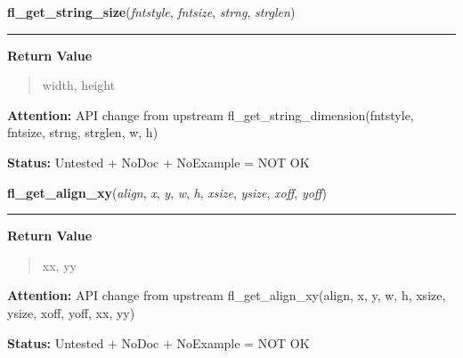     \label{xformslib:library:fl_get_string_dimension}

    \vspace{0.5ex}

\hspace{.8\funcindent}\begin{boxedminipage}{\funcwidth}

    \raggedright \textbf{fl\_get\_string\_size}(\textit{fntstyle}, \textit{fntsize}, \textit{strng}, \textit{strglen})

    \vspace{-1.5ex}

    \rule{\textwidth}{0.5\fboxrule}
\setlength{\parskip}{2ex}
\setlength{\parskip}{1ex}
      \textbf{Return Value}
    \vspace{-1ex}

      \begin{quote}
      width, height

      \end{quote}

\textbf{Attention:} API change from upstream fl\_get\_string\_dimension(fntstyle, fntsize, 
strng, strglen, w, h)



\textbf{Status:} Untested + NoDoc + NoExample = NOT OK



    \end{boxedminipage}

    \label{xformslib:library:fl_get_align_xy}

    \vspace{0.5ex}

\hspace{.8\funcindent}\begin{boxedminipage}{\funcwidth}

    \raggedright \textbf{fl\_get\_align\_xy}(\textit{align}, \textit{x}, \textit{y}, \textit{w}, \textit{h}, \textit{xsize}, \textit{ysize}, \textit{xoff}, \textit{yoff})

    \vspace{-1.5ex}

    \rule{\textwidth}{0.5\fboxrule}
\setlength{\parskip}{2ex}
\setlength{\parskip}{1ex}
      \textbf{Return Value}
    \vspace{-1ex}

      \begin{quote}
      xx, yy

      \end{quote}

\textbf{Attention:} API change from upstream fl\_get\_align\_xy(align, x, y, w, h, xsize, 
ysize, xoff, yoff, xx, yy)



\textbf{Status:} Untested + NoDoc + NoExample = NOT OK



    \end{boxedminipage}

